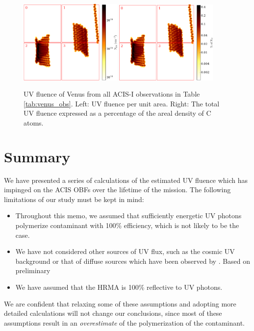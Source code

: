 \documentclass[11pt]{article}
\begin{document}
\begin{figure}
\begin{center}
\includegraphics[width=0.45\textwidth]{venus_all_fluence.eps}
\includegraphics[width=0.45\textwidth]{venus_all_fluence_percent.eps}
\caption{UV fluence of Venus from all ACIS-I observations in Table \ref{tab:venus_obs}. Left: UV fluence per unit area. Right: The total UV fluence expressed as a percentage of the areal density of C atoms.\label{fig:total_venus_fluence}}
\end{center}
\end{figure}

\section{Summary}

We have presented a series of calculations of the estimated UV fluence which has impinged on the ACIS OBFs
over the lifetime of the mission. The following limitations of our study must be kept in mind:

\begin{itemize}
\item Throughout this memo, we assumed that sufficiently energetic UV photons polymerize contaminant with 100\% efficiency, which is not likely to be the case.
\item We have not considered other sources of UV flux, such as the cosmic UV background or that of diffuse sources which have been observed by \chandra. Based on preliminary
\item We have assumed that the HRMA is 100\% reflective to UV photons.
\end{itemize}

We are confident that relaxing some of these assumptions and adopting more detailed calculations will not change our
conclusions, since most of these assumptions result in an {\it overestimate} of the polymerization of the contaminant.
\end{document}
